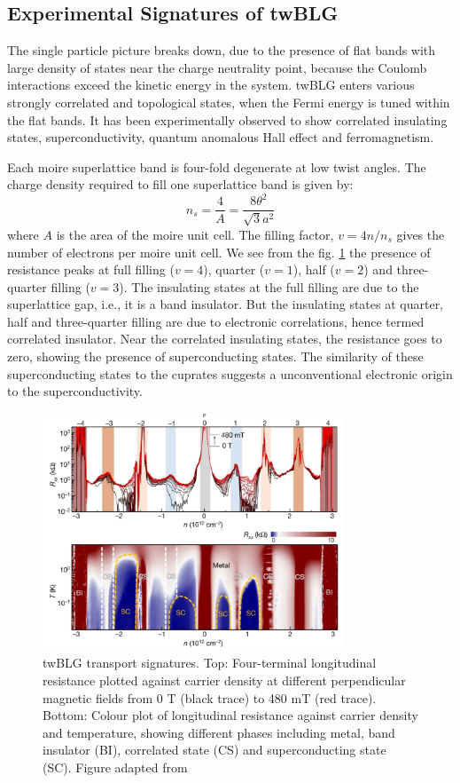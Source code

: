 \subsection{Experimental Signatures of twBLG}
The single particle picture breaks down, due to the presence of flat bands with large density of states near the charge neutrality point, because the Coulomb interactions exceed the kinetic energy in the system. twBLG enters various strongly correlated and topological states, when the Fermi energy is tuned within the flat bands. It has been experimentally observed to show correlated insulating states, superconductivity, quantum anomalous Hall effect and ferromagnetism.

Each moire superlattice band is four-fold degenerate at low twist angles. The charge density required to fill one superlattice band is given by:
\begin{equation}
    n_s=\frac{4}{A}=\frac{8\theta^2}{\sqrt{3}a^2}
\end{equation}
where $A$ is the area of the moire unit cell. The filling factor, $v=4n/n_s$ gives the number of electrons per moire unit cell. We see from the fig. \ref{fig:twBLG} the presence of resistance peaks at full filling ($v=4$), quarter ($v=1$), half ($v=2$) and three-quarter filling ($v=3$). The insulating states at the full filling are due to the superlattice gap, i.e., it is a band insulator. But the insulating states at quarter, half and three-quarter filling are due to electronic correlations, hence termed correlated insulator. Near the correlated insulating states, the resistance goes to zero, showing the presence of superconducting states. The similarity of these superconducting states to the cuprates suggests a unconventional electronic origin to the superconductivity.

 \begin{figure}[H]
        \centering
         \includegraphics[width=0.8\textwidth]{figures/res_phase.jpg}
         \caption{twBLG transport signatures. Top:  Four-terminal longitudinal resistance plotted against carrier density at different perpendicular magnetic fields from 0 T (black trace) to 480 mT (red trace). Bottom:  Colour plot of longitudinal resistance against carrier density and temperature, showing different phases including metal, band insulator (BI), correlated state (CS) and superconducting state (SC). Figure adapted from \cite{Lu2019}}
         \label{fig:twBLG}
\end{figure}